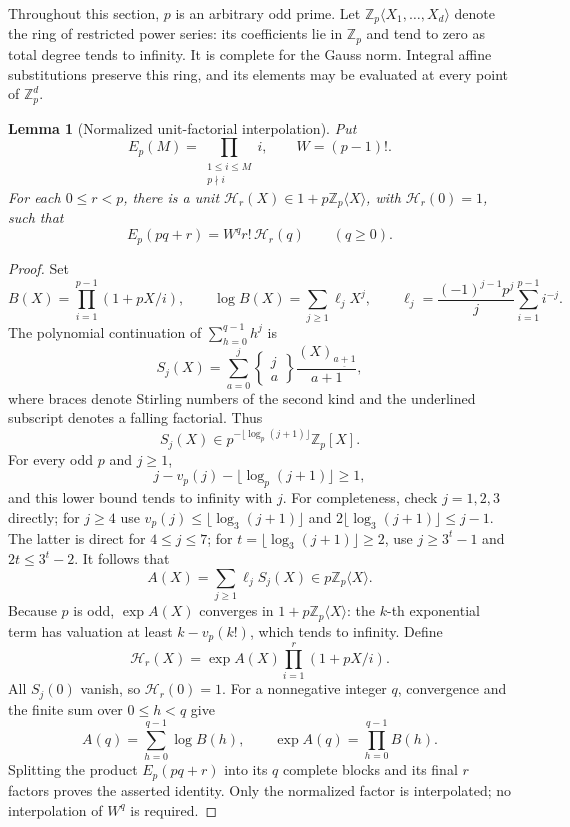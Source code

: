 \documentclass[11pt,a4paper]{article}
\newtheorem{lemma}[theorem]{Lemma}
\theoremstyle{remark}\newtheorem{remark}[theorem]{Remark}
\newcommand{\Z}{\mathbb Z}\newcommand{\Q}{\mathbb Q}
\begin{document}
Throughout this section, \(p\) is an arbitrary odd prime.
Let \(\Z_p\langle X_1,\ldots,X_d\rangle\) denote the ring of restricted
power series: its coefficients lie in \(\Z_p\) and tend to zero as total
degree tends to infinity. It is complete for the Gauss norm. Integral
affine substitutions preserve this ring, and its elements may be evaluated
at every point of \(\Z_p^d\).

\begin{lemma}[Normalized unit-factorial interpolation]\label{kernel:units}
Put
\[
 E_p(M)=\prod_{\substack{1\le i\le M\\p\nmid i}}i,
 \qquad W=(p-1)!.
\]
For each \(0\le r<p\), there is a unit
\(\mathcal H_r(X)\in1+p\Z_p\langle X\rangle\), with
\(\mathcal H_r(0)=1\), such that
\[
 E_p(pq+r)=W^q r!\,\mathcal H_r(q)\qquad(q\ge0).
\]
\end{lemma}
\begin{proof}
Set
\[
 B(X)=\prod_{i=1}^{p-1}(1+pX/i),\qquad
 \log B(X)=\sum_{j\ge1}\ell_jX^j,\qquad
 \ell_j=\frac{(-1)^{j-1}p^j}{j}\sum_{i=1}^{p-1}i^{-j}.
\]
The polynomial continuation of \(\sum_{h=0}^{q-1}h^j\) is
\[
 S_j(X)=\sum_{a=0}^j
 \left\{\begin{matrix}j\\a\end{matrix}\right\}
 \frac{(X)_{\underline{a+1}}}{a+1},
\]
where braces denote Stirling numbers of the second kind and the underlined
subscript denotes a falling factorial. Thus
\[
 S_j(X)\in p^{-\lfloor\log_p(j+1)\rfloor}\Z_p[X].
\]
For every odd \(p\) and \(j\ge1\),
\[
 j-v_p(j)-\lfloor\log_p(j+1)\rfloor\ge1,
\]
and this lower bound tends to infinity with \(j\).
For completeness, check \(j=1,2,3\) directly; for \(j\ge4\) use
\(v_p(j)\le\lfloor\log_3(j+1)\rfloor\) and
\(2\lfloor\log_3(j+1)\rfloor\le j-1\).
The latter is direct for \(4\le j\le7\); for
\(t=\lfloor\log_3(j+1)\rfloor\ge2\), use
\(j\ge3^t-1\) and \(2t\le3^t-2\).
It follows that
\[
 A(X)=\sum_{j\ge1}\ell_jS_j(X)\in p\Z_p\langle X\rangle.
\]
Because \(p\) is odd, \(\exp A(X)\) converges in
\(1+p\Z_p\langle X\rangle\): the \(k\)-th exponential term has
valuation at least \(k-v_p(k!)\), which tends to infinity.
Define
\[
 \mathcal H_r(X)=\exp A(X)\prod_{i=1}^r(1+pX/i).
\]
All \(S_j(0)\) vanish, so \(\mathcal H_r(0)=1\).
For a nonnegative integer \(q\), convergence and the finite sum over
\(0\le h<q\) give
\[
 A(q)=\sum_{h=0}^{q-1}\log B(h),\qquad
 \exp A(q)=\prod_{h=0}^{q-1}B(h).
\]
Splitting the product \(E_p(pq+r)\) into its \(q\) complete blocks and
its final \(r\) factors proves the asserted identity.
Only the normalized factor is interpolated; no interpolation of \(W^q\)
is required.
\end{proof}
\end{document}
